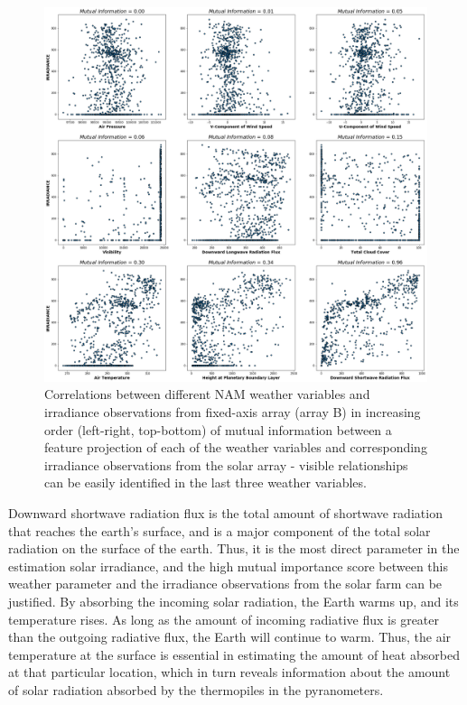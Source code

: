 \begin{figure}[htbp]
    \begin{center}
    	\includegraphics[width=\textwidth]{chapter3/fig_mi_ugabpoa1irr.png}
    	\caption[Correlations between NAM weather variables and irradiance observations from fixed-axis array.]{Correlations between different NAM weather variables and irradiance observations from fixed-axis array (array B) in increasing order (left-right, top-bottom) of mutual information between a feature projection of each of the weather variables and corresponding irradiance observations from the solar array - visible relationships can be easily identified in the last three weather variables.}
    \label{fig:fig_mi_forecast_target_hr1}
    \end{center}
\end{figure}

\par Downward shortwave radiation flux is the total amount of shortwave radiation that reaches the earth's surface, and is a major component of the total solar radiation on the surface of the earth. Thus, it is the most direct parameter in the estimation solar irradiance, and the high mutual importance score between this weather parameter and the irradiance observations from the solar farm can be justified. By absorbing the incoming solar radiation, the Earth warms up, and its temperature rises. As long as the amount of incoming radiative flux is greater than the outgoing radiative flux, the Earth will continue to warm. Thus, the air temperature at the surface is essential in estimating the amount of heat absorbed at that particular location, which in turn reveals information about the amount of solar radiation absorbed by the thermopiles in the pyranometers. 


